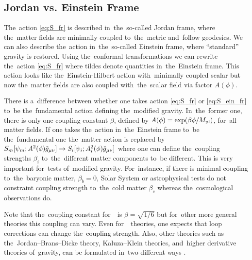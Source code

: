 \subsection{Jordan vs. Einstein Frame}
The~action \eqref{eq:S_fr} is described in~the~so-called Jordan frame, where the~matter fields are minimally coupled to~the~metric and~follow geodesics. We can also describe the~action in~the~so-called Einstein frame, where ``standard'' gravity is restored. Using the~conformal transformations
we can rewrite the~action \eqref{eq:S_fr}
where tildes denote quantities in~the~Einstein frame. This action looks like the~Einstein-Hilbert action with~minimally coupled scalar but now the~matter fields are also coupled with~the~scalar field via factor $A(\phi)$. %

There is a~difference between whether one takes action \eqref{eq:S_fr} or \eqref{eq:S_ein_fr} to~be the~fundamental action defining the~modified gravity. In~the~former one, there is only one coupling constant $\beta$, defined by $A(\phi)=\exp(\beta\phi/M_{\text{\scriptsize pl}})$, for~all matter fields. If one takes the~action in~the~Einstein frame to~be the~fundamental one the~matter action is replaced by $S_m[\psi_m;A^2(\phi)\tilde{g}_{\mu\nu}]\rightarrow S_i[\psi_i;A_i^2(\phi)\tilde{g}_{\mu\nu}]$ where one can define the~coupling strengths $\beta_i$ to~the~different matter components to~be different. This is very important for~tests of~modified gravity. For~instance, if there is minimal coupling to~the~baryonic matter, $\beta_b=0$, Solar System or astrophysical tests do not constraint coupling strength to~the~cold matter $\beta_c$ whereas the~cosmological observations do.

Note that the~coupling constant for~\fR\ is $\beta=\sqrt{1/6}$ but for~other more general theories this coupling can vary. Even for~\fR\ theories, one expects that loop corrections can change the~coupling strength. Also, other theories such as the~Jordan--Brans--Dicke theory, Kaluza--Klein theories, and~higher derivative theories of~gravity, can be formulated in~two different ways \parencite{Faraoni:1998qx}.

